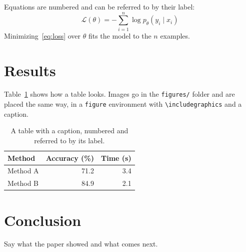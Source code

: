 Equations are numbered and can be referred to by their label:
\begin{equation}
  \mathcal{L}(\theta) = -\sum_{i=1}^{n} \log p_\theta(y_i \mid x_i)
  \label{eq:loss}
\end{equation}
Minimizing~\eqref{eq:loss} over $\theta$ fits the model to the $n$ examples.

\section{Results}
\label{sec:results}

Table~\ref{tab:results} shows how a table looks. Images go in the
\texttt{figures/} folder and are placed the same way, in a \texttt{figure}
environment with \texttt{\textbackslash includegraphics} and a caption.

\begin{table}[htbp]
  \centering
  \caption{A table with a caption, numbered and referred to by its label.}
  \label{tab:results}
  \begin{tabular}{lrr}
    \toprule
    Method   & Accuracy (\%) & Time (s) \\
    \midrule
    Method A & 71.2          & 3.4      \\
    Method B & 84.9          & 2.1      \\
    \bottomrule
  \end{tabular}
\end{table}

\section{Conclusion}
\label{sec:conclusion}

Say what the paper showed and what comes next.





